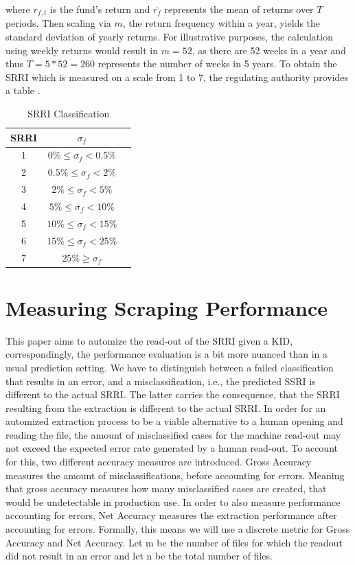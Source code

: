 \documentclass[aodsor,preprint]{imsart}
\numberwithin{equation}{section}
\theoremstyle{plain}
\begin{document}
where $r_{f, t}$ is the fund's return and $\overline{r_f}$ represents the mean of returns over $T$ periods. Then scaling via $m$, the return frequency within a year, yields the standard deviation of yearly returns. For illustrative purposes, the calculation using weekly returns would result in $m = 52$, as there are 52 weeks in a year and thus $T = 5 * 52 = 260$ represents the number of weeks in 5 years. To obtain the SRRI which is measured on a scale from 1 to 7, the regulating authority provides a table \citep{BGB1}.
\begin{table}[H]
\begin{center}
	\caption{SRRI Classification}
\begin{tabular}{|c|c|c}
	\hline
	SRRI & $\sigma_f$ \\
	\hline
	1 & $0\% \leq\sigma_f<0.5\%$\\
	\hline
	2 & $0.5\%\leq\sigma_f<2\%$\\
	\hline
	3 & $2\%\leq\sigma_f<5\%$\\
	\hline
	4 & $5\%\leq\sigma_f<10\%$\\
	\hline
	5 & $10\%\leq\sigma_f<15\%$\\
	\hline
	6 & $15\%\leq\sigma_f<25\%$\\
	\hline
	7 & $25\%\geq\sigma_f$\\
	\hline
\end{tabular}
\end{center}
\end{table}

\section{Measuring Scraping Performance}

This paper aims to automize the read-out of the SRRI given a KID, correspondingly, the performance evaluation is a bit more nuanced than in a usual prediction setting. We have to distinguish between a failed classification that results in an error, and a misclassification, i.e., the predicted SSRI is different to the actual SRRI. The latter carries the consequence, that the SRRI resulting from the extraction is different to the actual SRRI. In order for an automized extraction process to be a viable alternative to a human opening and reading the file, the amount of misclassified cases for the machine read-out may not exceed the expected error rate generated by a human read-out. To account for this, two different accuracy measures are introduced. Gross Accuracy measures the amount of misclassifications, before accounting for errors. Meaning that gross accuracy measures how many misclassified cases are created, that would be undetectable in production use. In order to also measure performance accounting for errors, Net Accuracy measures the extraction performance after accounting for errors. Formally, this means we will use a discrete metric for Gross Accuracy and Net Accuracy. Let m be the number of files for which the readout did not result in an error and let n be the total number of files.
\end{document}

